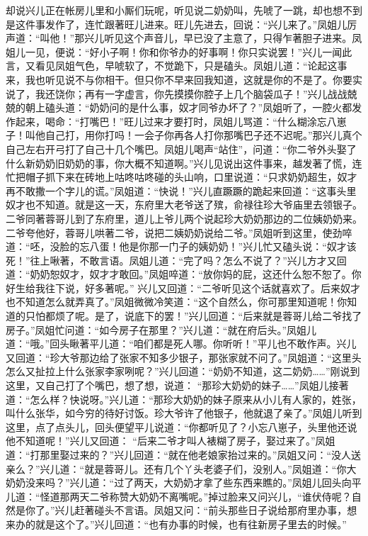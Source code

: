 \begin{parag}


    却说兴儿正在帐房儿里和小厮们玩呢，听见说二奶奶叫，先唬了一跳，却也想不到是这件事发作了，连忙跟著旺儿进来。旺儿先进去，回说：“兴儿来了。”凤姐儿厉声道：“叫他！”那兴儿听见这个声音儿，早已没了主意了，只得乍著胆子进来。凤姐儿一见，便说：“好小子啊！你和你爷办的好事啊！你只实说罢！”兴儿一闻此言，又看见凤姐气色，早唬软了，不觉跪下，只是磕头。凤姐儿道：“论起这事来，我也听见说不与你相干。但只你不早来回我知道，这就是你的不是了。你要实说了，我还饶你；再有一字虚言，你先摸摸你腔子上几个脑袋瓜子！”兴儿战战兢兢的朝上磕头道：“奶奶问的是什么事，奴才同爷办坏了？”凤姐听了，一腔火都发作起来，喝命：“打嘴巴！”旺儿过来才要打时，凤姐儿骂道：“什么糊涂忘八崽子！叫他自己打，用你打吗！一会子你再各人打你那嘴巴子还不迟呢。”那兴儿真个自己左右开弓打了自己十几个嘴巴。凤姐儿喝声“站住”，问道：“你二爷外头娶了什么新奶奶旧奶奶的事，你大概不知道啊。”兴儿见说出这件事来，越发著了慌，连忙把帽子抓下来在砖地上咕咚咕咚碰的头山响，口里说道：“只求奶奶超生，奴才再不敢撒一个字儿的谎。”凤姐道：“快说！”兴儿直蹶蹶的跪起来回道：“这事头里奴才也不知道。就是这一天，东府里大老爷送了殡，俞禄往珍大爷庙里去领银子。二爷同著蓉哥儿到了东府里，道儿上爷儿两个说起珍大奶奶那边的二位姨奶奶来。二爷夸他好，蓉哥儿哄著二爷，说把二姨奶奶说给二爷。”凤姐听到这里，使劲啐道：“呸，没脸的忘八蛋！他是你那一门子的姨奶奶！”兴儿忙又磕头说：“奴才该死！”往上啾著，不敢言语。凤姐儿道：“完了吗？怎么不说了？”兴儿方才又回道：“奶奶恕奴才，奴才才敢回。”凤姐啐道：“放你妈的屁，这还什么恕不恕了。你好生给我往下说，好多著呢。” 兴儿又回道：“二爷听见这个话就喜欢了。后来奴才也不知道怎么就弄真了。”凤姐微微冷笑道：“这个自然么，你可那里知道呢！你知道的只怕都烦了呢。是了，说底下的罢！”兴儿回道：“后来就是蓉哥儿给二爷找了房子。”凤姐忙问道：“如今房子在那里？”兴儿道：“就在府后头。”凤姐儿道：“哦。”回头瞅著平儿道：“咱们都是死人哪。你听听！”平儿也不敢作声。兴儿又回道：“珍大爷那边给了张家不知多少银子，那张家就不问了。”凤姐道：“这里头怎么又扯拉上什么张家李家咧呢？”兴儿回道：“奶奶不知道，这二奶奶……”刚说到这里，又自己打了个嘴巴，想了想，说道： “那珍大奶奶的妹子……”凤姐儿接著道：“怎么样？快说呀。”兴儿道：“那珍大奶奶的妹子原来从小儿有人家的，姓张，叫什么张华，如今穷的待好讨饭。珍大爷许了他银子，他就退了亲了。”凤姐儿听到这里，点了点头儿，回头便望平儿说道：“你都听见了？小忘八崽子，头里他还说他不知道呢！”兴儿又回道： “后来二爷才叫人裱糊了房子，娶过来了。”凤姐道：“打那里娶过来的？”兴儿回道：“就在他老娘家抬过来的。”凤姐又问：“没人送亲么？”兴儿道：“就是蓉哥儿。还有几个丫头老婆子们，没别人。”凤姐道：“你大奶奶没来吗？”兴儿道：“过了两天，大奶奶才拿了些东西来瞧的。”凤姐儿回头向平儿道：“怪道那两天二爷称赞大奶奶不离嘴呢。”掉过脸来又问兴儿，“谁伏侍呢？自然是你了。”兴儿赶著碰头不言语。凤姐又问：“前头那些日子说给那府里办事，想来办的就是这个了。”兴儿回道：“也有办事的时候，也有往新房子里去的时候。”
\end{parag}


